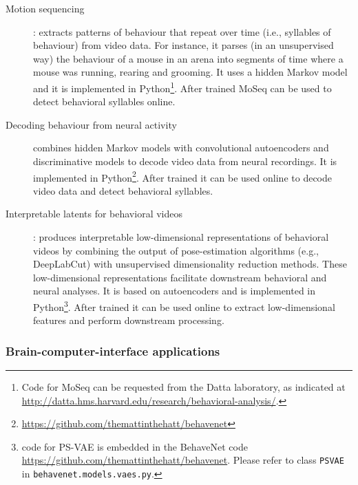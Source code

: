 \begin{description}

    \item[Motion sequencing]\citep[MoSeq;][]{wiltschkoEtAl15}: extracts patterns
        of behaviour that repeat over time (i.e., syllables of behaviour) from
        video data. For instance, it parses (in an unsupervised way) the
        behaviour of a mouse in an arena into segments of time where a mouse
        was running, rearing and grooming. It uses a hidden Markov model and it
        is implemented in Python\footnote{Code for MoSeq can be requested from
        the Datta laboratory, as indicated at
        \href{http://datta.hms.harvard.edu/research/behavioral-analysis/}{http://datta.hms.harvard.edu/research/behavioral-analysis/}.}.
        After trained MoSeq can be used to detect behavioral syllables online.

    \item[Decoding behaviour from neural
        activity]\citep[BehaveNet;][]{battyEtAl19} combines hidden Markov
        models with convolutional autoencoders and discriminative models to
        decode video data from neural recordings. It is implemented in
        Python\footnote{\href{https://github.com/themattinthehatt/behavenet}{https://github.com/themattinthehatt/behavenet}}.
        After trained it can be used online to decode video data and detect
        behavioral syllables.

    \item[Interpretable latents for behavioral videos]\citep[Partitioned
        Subspace Variational Autoencoder, PS-VAE;][]{whitewayEtAl21}: produces
        interpretable low-dimensional representations of behavioral videos by
        combining the output of pose-estimation algorithms (e.g., DeepLabCut)
        with unsupervised dimensionality reduction methods. These
        low-dimensional representations facilitate downstream behavioral and
        neural analyses. It is based on autoencoders and is implemented in
        Python\footnote{code for PS-VAE is embedded in the BehaveNet code
        \href{https://github.com/themattinthehatt/behavenet}{https://github.com/themattinthehatt/behavenet}.
        Please refer to class \texttt{PSVAE} in 
        \texttt{behavenet.models.vaes.py}.}. After trained it can be used
        online to extract low-dimensional features and perform downstream
        processing.

\end{description}

\subsubsection{Brain-computer-interface applications}
\label{sec:bci}

